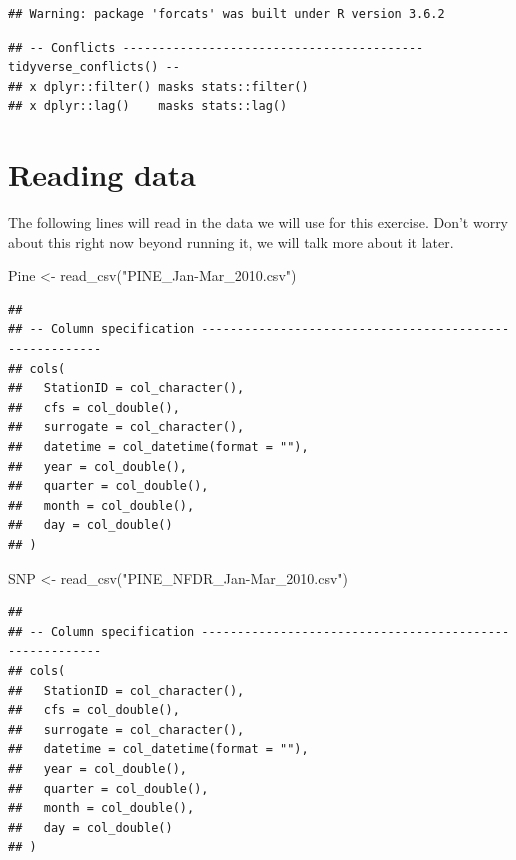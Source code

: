 \documentclass[
]{book}
\newenvironment{Shaded}{\begin{snugshade}}{\end{snugshade}}
\newcommand{\FunctionTok}[1]{\textcolor[rgb]{0.00,0.00,0.00}{#1}}
\newcommand{\NormalTok}[1]{#1}
\newcommand{\OtherTok}[1]{\textcolor[rgb]{0.56,0.35,0.01}{#1}}
\newcommand{\StringTok}[1]{\textcolor[rgb]{0.31,0.60,0.02}{#1}}
\begin{document}
\begin{verbatim}
## Warning: package 'forcats' was built under R version 3.6.2
\end{verbatim}

\begin{verbatim}
## -- Conflicts ------------------------------------------ tidyverse_conflicts() --
## x dplyr::filter() masks stats::filter()
## x dplyr::lag()    masks stats::lag()
\end{verbatim}

\hypertarget{reading-data}{%
\section{Reading data}\label{reading-data}}

The following lines will read in the data we will use for this exercise. Don't worry about this right now beyond running it, we will talk more about it later.

\begin{Shaded}
\begin{Highlighting}[]
\NormalTok{Pine }\OtherTok{\textless{}{-}} \FunctionTok{read\_csv}\NormalTok{(}\StringTok{"PINE\_Jan{-}Mar\_2010.csv"}\NormalTok{) }
\end{Highlighting}
\end{Shaded}

\begin{verbatim}
## 
## -- Column specification --------------------------------------------------------
## cols(
##   StationID = col_character(),
##   cfs = col_double(),
##   surrogate = col_character(),
##   datetime = col_datetime(format = ""),
##   year = col_double(),
##   quarter = col_double(),
##   month = col_double(),
##   day = col_double()
## )
\end{verbatim}

\begin{Shaded}
\begin{Highlighting}[]
\NormalTok{SNP }\OtherTok{\textless{}{-}} \FunctionTok{read\_csv}\NormalTok{(}\StringTok{"PINE\_NFDR\_Jan{-}Mar\_2010.csv"}\NormalTok{)}
\end{Highlighting}
\end{Shaded}

\begin{verbatim}
## 
## -- Column specification --------------------------------------------------------
## cols(
##   StationID = col_character(),
##   cfs = col_double(),
##   surrogate = col_character(),
##   datetime = col_datetime(format = ""),
##   year = col_double(),
##   quarter = col_double(),
##   month = col_double(),
##   day = col_double()
## )
\end{verbatim}
\end{document}
